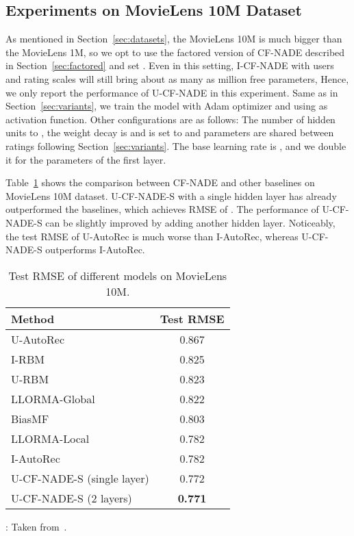 \documentclass{article}
\newcommand{\cfnade}{CF-NADE\xspace}
\begin{document}
 
\subsection{Experiments on MovieLens 10M Dataset}
\label{sec:movielens10m}
As mentioned in Section~\ref{sec:datasets}, the MovieLens 10M 
is much bigger than the MovieLens 1M, so we opt to use the factored
version of \cfnade described in Section~\ref{sec:factored} and set
. Even in this setting, I-\cfnade with  users and 
rating scales will still bring about as many as  million free
parameters,
Hence, we only report the performance of
U-\cfnade in this experiment. Same as in Section~\ref{sec:variants},
we train the model with Adam optimizer and using  as activation
function.  Other configurations are as follows: The number of hidden
units to , the weight decay is  and  is set to
 and parameters are shared between ratings following
Section~\ref{sec:variants}. The base learning rate is , and we
double it for the parameters of the first layer.

Table~\ref{tab:movielens10m} shows the comparison between \cfnade and
other baselines on MovieLens 10M dataset. U-{\cfnade}-S with a single
hidden layer has already outperformed the baselines, which achieves
RMSE of . The performance of U-{\cfnade}-S can be slightly
improved by adding another hidden layer. Noticeably, the test RMSE of
U-AutoRec is much worse than I-AutoRec, whereas U-{\cfnade}-S
outperforms I-AutoRec.

\begin{table}[h]
 \caption{Test RMSE of different models on MovieLens 10M.}
 \label{tab:movielens10m}
 \begin{center}
 \begin{small}
 \begin{sc}
 \begin{tabular}{lc}
 \hline
 \abovespace\belowspace
 Method & Test RMSE  \\
 \hline
 \abovespace
 U-AutoRec~\citep{sedhain2015autorec} & 0.867\\
 I-RBM & 0.825\\
 U-RBM & 0.823\\
 LLORMA-Global~\citep{lee2013local} & 0.822\\
 BiasMF & 0.803 \\
 LLORMA-Local~\citep{lee2013local} & 0.782\\
 \belowspace
 I-AutoRec~\citep{sedhain2015autorec} & 0.782\\
 U-{\cfnade}-S (single layer) & 0.772\\
 U-{\cfnade}-S (2 layers) & {\bf 0.771}\\
 \hline
 \end{tabular}
 \end{sc}
 \end{small}
 \begin{minipage}{0.48\textwidth}
{\small
: Taken from~\citep{sedhain2015autorec}.
}
\end{minipage}
 \end{center}
 \end{table}
 
\end{document}
